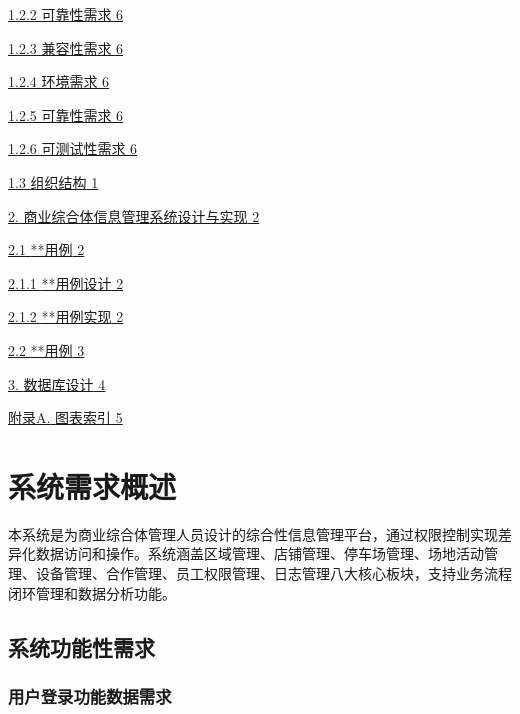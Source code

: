 \documentclass[]{article}
\begin{document}
\protect\hyperlink{ux53efux9760ux6027ux9700ux6c42}{1.2.2 可靠性需求 6}

\protect\hyperlink{ux517cux5bb9ux6027ux9700ux6c42}{1.2.3 兼容性需求 6}

\protect\hyperlink{ux73afux5883ux9700ux6c42}{1.2.4 环境需求 6}

\protect\hyperlink{ux53efux9760ux6027ux9700ux6c42-1}{1.2.5 可靠性需求 6}

\protect\hyperlink{ux53efux6d4bux8bd5ux6027ux9700ux6c42}{1.2.6
  可测试性需求 6}

\protect\hyperlink{_Toc77076515}{{1.3} {组织结构} 1}

\protect\hyperlink{ux5546ux4e1aux7efcux5408ux4f53ux4fe1ux606fux7ba1ux7406ux7cfbux7edfux8bbeux8ba1ux4e0eux5b9eux73b0}{{2.}
商业综合体信息管理{系统设计与实现} 2}

\protect\hyperlink{ux7528ux6237ux7528ux4f8b}{{2.1} {**用例} 2}

\protect\hyperlink{ux7528ux6237ux7528ux4f8bux8bbeux8ba1}{{2.1.1}
    {**用例设计} 2}

\protect\hyperlink{ux7528ux6237ux7528ux4f8bux5b9eux73b0}{{2.1.2}
    {**用例实现} 2}

\protect\hyperlink{ux7528ux4f8b}{{2.2} {**用例} 3}

\protect\hyperlink{ux6570ux636eux5e93ux8bbeux8ba1}{{3.} {数据库设计} 4}

\protect\hyperlink{_Toc77076522}{{附录A.} {图表索引} 5}

\hypertarget{ux7cfbux7edfux9700ux6c42ux6982ux8ff0}{%
  \section{系统需求概述}\label{ux7cfbux7edfux9700ux6c42ux6982ux8ff0}}

本系统是为商业综合体管理人员设计的综合性信息管理平台，通过权限控制实现差异化数据访问和操作。系统涵盖区域管理、店铺管理、停车场管理、场地活动管理、设备管理、合作管理、员工权限管理、日志管理八大核心板块，支持业务流程闭环管理和数据分析功能。

\hypertarget{ux7cfbux7edfux529fux80fdux6027ux9700ux6c42}{%
  \subsection{系统功能性需求}\label{ux7cfbux7edfux529fux80fdux6027ux9700ux6c42}}

\hypertarget{ux7528ux6237ux767bux5f55ux529fux80fdux6570ux636eux9700ux6c42}{%
  \subsubsection{用户登录功能数据需求}\label{ux7528ux6237ux767bux5f55ux529fux80fdux6570ux636eux9700ux6c42}}
\end{document}
